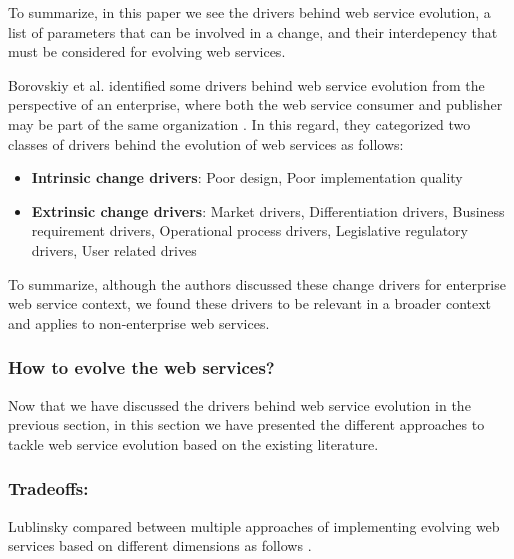 \documentclass[runningheads,a4paper]{llncs}
\begin{document}
To summarize, in this paper we see the drivers behind web service evolution, a list of parameters that can be involved in a change, and their interdepency that must be considered for evolving web services.

Borovskiy et al. identified some drivers behind web service evolution from the perspective of an enterprise, where both the web service consumer and publisher may be part of the same organization \cite{borovskiy2008evolution}. In this regard, they categorized two classes of drivers behind the evolution of web services as follows:

\begin{itemize}
  \item \textbf{Intrinsic change drivers}: Poor design, Poor implementation quality
  \item \textbf{Extrinsic change drivers}: Market drivers, Differentiation drivers, Business requirement drivers, Operational process drivers, Legislative regulatory drivers, User related drives
\end{itemize}

To summarize, although the authors discussed these change drivers for enterprise web service context, we found these drivers to be relevant in a broader context and applies to non-enterprise web services.

\subsubsection{How to evolve the web services?} %
\label{sub:how_to_evolve_the_web_services_}
Now that we have discussed the drivers behind web service evolution in the previous section, in this section we have presented the different approaches to tackle web service evolution based on the existing literature.

\subsubsection{Tradeoffs:} %
Lublinsky compared between multiple approaches of implementing evolving web services based on different dimensions as follows \cite{lublinsky2007versioning}.
\end{document}

